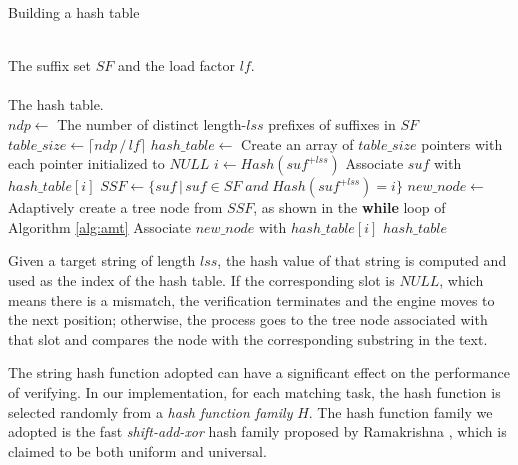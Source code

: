 \documentclass{article}
\begin{document}


\begin{algorithm}
  \caption{Building a hash table}\scriptsize
  \label{alg:hash}
  \begin{algorithmic}[1]
    \REQUIRE ~~\\
    The suffix set $SF$ and the load factor $lf$. \\
    \ENSURE ~~\\
    The hash table.\\
    \STATE
    \STATE $ndp \leftarrow$ The number of distinct length-$lss$
    prefixes of suffixes in $SF$
    \STATE $table\_size \leftarrow \lceil ndp\,/\,lf \rceil$
    \STATE $hash\_table \leftarrow$ Create an array  of
    $table\_size$ pointers with each pointer initialized to $NULL$
    \STATE
    \STATE $i \leftarrow Hash(suf^{+lss})$
    \STATE Associate $suf$ with $hash\_table[i]$
    \ENDFOR
    \STATE
    \STATE $SSF \leftarrow \{suf\,|\,suf\in SF\; and\; Hash(suf^{+lss})=i\}$
    \STATE $new\_node \leftarrow$ Adaptively create a tree node from
    $SSF$, as shown in the \textbf{while} loop of Algorithm \ref{alg:amt}
    \STATE Associate $new\_node$ with $hash\_table[i]$
    \ENDIF
    \ENDFOR
    \STATE
    \RETURN $hash\_table$
  \end{algorithmic}
\end{algorithm}

Given a target string of length $lss$, the hash value of that string
is computed and used as the index of the hash table. If the
corresponding slot is $NULL$, which means there is a mismatch, the
verification terminates and the engine moves to the next position;
otherwise, the process goes to the tree node associated with that slot
and compares the node with the corresponding substring in the text.

The string hash function adopted can have a significant effect on the
performance of verifying. In our implementation, for each matching
task, the hash function is selected randomly from a \emph{hash
  function family} $H$. The hash function family we adopted is the
fast \emph{shift-add-xor} hash family proposed by Ramakrishna
\cite{Ramakrishna1997}, which is claimed to be both uniform and
universal.
\end{document}
